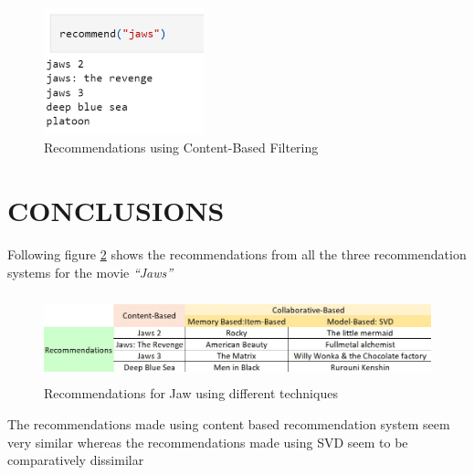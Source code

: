 \documentclass[a4paper,10pt]{article}
\begin{document}
\begin{itemize}
\begin{figure}[H]
        
        \centering
        \includegraphics[height=3.7cm]{figures/recommend(content).png}
        \caption{Recommendations using Content-Based Filtering}
        \label{recommend(content)}
\end{figure}

\end{itemize}

\section{CONCLUSIONS}
Following figure \ref{conclude} shows the recommendations from all the three recommendation systems for the movie \textit{“Jaws”}

\begin{figure}[H]
        
        \centering
        \includegraphics[height=2.5cm]{figures/conclude.jpg}
        \caption{Recommendations for Jaw using different techniques}
        \label{conclude}
\end{figure}

The recommendations made using content based recommendation system seem very similar whereas the recommendations made using SVD seem to be comparatively dissimilar
\end{document}
